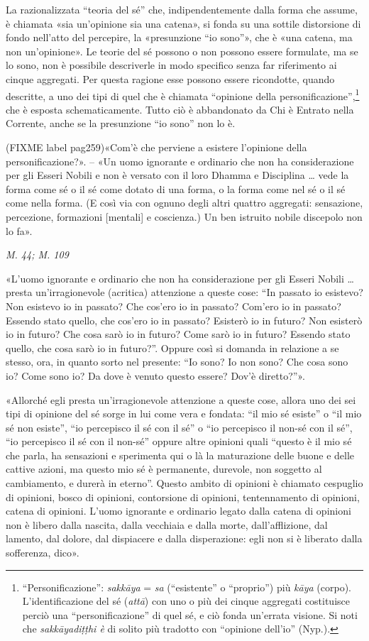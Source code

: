  La razionalizzata “teoria del sé” che,
indipendentemente dalla forma che assume, è chiamata «sia un’opinione
sia una catena», si fonda su una sottile distorsione di fondo nell’atto
del percepire, la «presunzione “io sono”», che è «una catena, ma non
un’opinione». Le teorie del sé possono o non possono essere formulate,
ma se lo sono, non è possibile descriverle in modo specifico senza far
riferimento ai cinque aggregati. Per questa ragione esse possono essere
ricondotte, quando descritte, a uno dei tipi di quel che è chiamata
“opinione della personificazione”,\footnote{“Personificazione”: \emph{sakkāya} = \emph{sa} (“esistente” o “proprio”) più \emph{kāya} (corpo). L’identificazione del sé (\emph{attā}) con uno o più dei cinque aggregati costituisce perciò una “personificazione” di quel sé, e ciò fonda un’errata visione. Si noti che \emph{sakkāyadiṭṭhi è} di solito più tradotto con “opinione dell’io” (Nyp.).} che è esposta
schematicamente. Tutto ciò è abbandonato da Chi è Entrato nella
Corrente, anche se la presunzione “io sono” non lo è.


 (FIXME label pag259)«Com’è che perviene a esistere l’opinione della
personificazione?». – «Un uomo ignorante e ordinario che non ha
considerazione per gli Esseri Nobili e non è versato con il loro Dhamma
e Disciplina … vede la forma come sé o il sé come dotato di una forma, o
la forma come nel sé o il sé come nella forma. (E così via con ognuno
degli altri quattro aggregati: sensazione, percezione, formazioni
[mentali] e coscienza.) Un ben istruito nobile discepolo non lo fa».


\emph{M. 44; M. 109}


«L’uomo ignorante e ordinario che non ha considerazione per gli Esseri
Nobili … presta un’irragionevole (acritica) attenzione a queste cose:
“In passato io esistevo? Non esistevo io in passato? Che cos’ero io in
passato? Com’ero io in passato? Essendo stato quello, che cos’ero io in
passato? Esisterò io in futuro? Non esisterò io in futuro? Che cosa sarò
io in futuro? Come sarò io in futuro? Essendo stato quello, che cosa
sarò io in futuro?”. Oppure così si domanda in relazione a se stesso,
ora, in quanto sorto nel presente: “Io sono? Io non sono? Che cosa sono
io? Come sono io? Da dove è venuto questo essere? Dov’è diretto?”».


«Allorché egli presta un’irragionevole attenzione a queste cose, allora
uno dei sei tipi di opinione del sé sorge in lui come vera e fondata:
“il mio sé esiste” o “il mio sé non esiste”, “io percepisco il sé con il
sé” o “io percepisco il non-sé con il sé”, “io percepisco il sé con il
non-sé” oppure altre opinioni quali “questo è il mio sé che parla, ha
sensazioni e sperimenta qui o là la maturazione delle buone e delle
cattive azioni, ma questo mio sé è permanente, durevole, non soggetto al
cambiamento, e durerà in eterno”. Questo ambito di opinioni è chiamato
cespuglio di opinioni, bosco di opinioni, contorsione di opinioni,
tentennamento di opinioni, catena di opinioni. L’uomo ignorante e
ordinario legato dalla catena di opinioni non è libero dalla nascita,
dalla vecchiaia e dalla morte, dall’afflizione, dal lamento, dal dolore,
dal dispiacere e dalla disperazione: egli non si è liberato dalla
sofferenza, dico».


